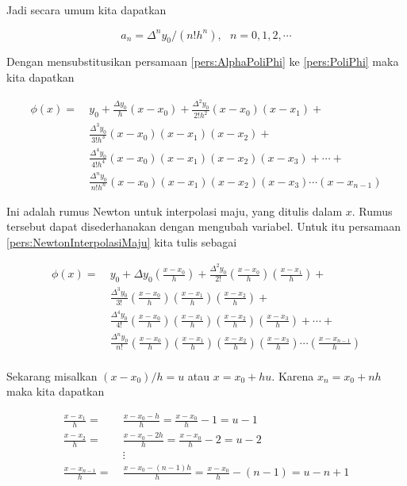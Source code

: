 Jadi secara umum kita dapatkan

\begin{equation}\label{pers:AlphaPoliPhi}
a_n = \Delta^n y_0 / (n!h^n),~~~n = 0,1,2,\cdots
\end{equation}

Dengan mensubstitusikan persamaan \ref{pers:AlphaPoliPhi} ke \ref{pers:PoliPhi} maka kita dapatkan

\begin{equation}\label{pers:NewtonInterpolasiMaju}
\begin{split}
\phi(x) =~& y_0 + \frac{\Delta y_0}{h}(x-x_0) + \frac{\Delta^2y_0}{2!h^2}(x-x_0)(x-x_1) +\\
&\frac{\Delta^3 y_0}{3!h^3}(x-x_0)(x-x_1)(x-x_2) +\\
&\frac{\Delta^4 y_0}{4!h^4}(x-x_0)(x-x_1)(x-x_2)(x-x_3) + \cdots +\\
&\frac{\Delta^n y_0}{n!h^n}(x-x_0)(x-x_1)(x-x_2)(x-x_3) \cdots (x-x_{n-1})
\end{split}
\end{equation}

Ini adalah rumus Newton untuk interpolasi maju, yang ditulis dalam $x$. Rumus tersebut dapat disederhanakan dengan mengubah variabel. Untuk itu persamaan \ref{pers:NewtonInterpolasiMaju} kita tulis sebagai

\begin{equation}\label{pers:NewtonInterpolasiMajuSederhana}
\begin{split}
\phi(x) =~& y_0 + \Delta y_0\left(\frac{x-x_0}{h}\right) + \frac{\Delta^2y_0}{2!}\left(\frac{x-x_0}{h}\right)\left(\frac{x-x_1}{h}\right) +\\
&\frac{\Delta^3y_0}{3!}\left(\frac{x-x_0}{h}\right)\left(\frac{x-x_1}{h}\right)\left(\frac{x-x_2}{h}\right) +\\
&\frac{\Delta^4y_0}{4!}\left(\frac{x-x_0}{h}\right)\left(\frac{x-x_1}{h}\right)\left(\frac{x-x_2}{h}\right)\left(\frac{x-x_3}{h}\right) + \cdots +\\
&\frac{\Delta^ny_0}{n!}\left(\frac{x-x_0}{h}\right)\left(\frac{x-x_1}{h}\right)\left(\frac{x-x_2}{h}\right)\left(\frac{x-x_3}{h}\right) \cdots \left(\frac{x-x_{n-1}}{h}\right)\\
\end{split}
\end{equation}

Sekarang misalkan $(x-x_0)/h = u$ atau $x=x_0+hu$. Karena $x_n=x_0+nh$ maka kita dapatkan

\begin{equation*}
\begin{split}
\frac{x-x_1}{h} =~& \frac{x-x_0-h}{h} = \frac{x-x_0}{h} - 1 = u - 1\\
\frac{x-x_2}{h} =~& \frac{x-x_0-2h}{h} = \frac{x-x_0}{h} - 2 = u - 2\\
&\vdots\\
\frac{x-x_{n-1}}{h} =~& \frac{x-x_0-(n-1)h}{h} = \frac{x-x_0}{h} - (n-1) = u -n + 1
\end{split}
\end{equation*}

